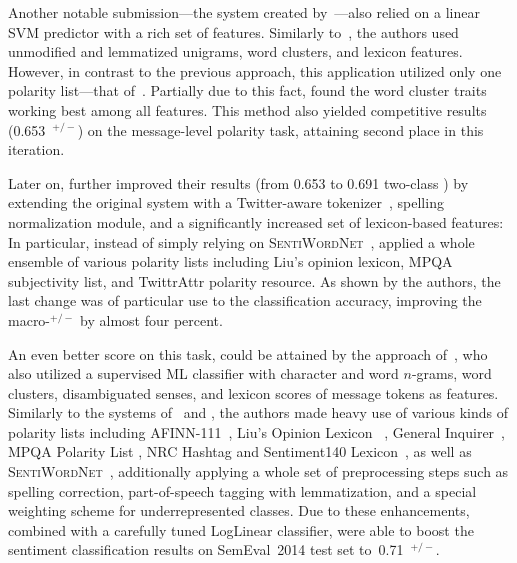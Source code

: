 Another notable submission---the system created
by~\citet{Guenther:13}---also relied on a linear SVM predictor with a
rich set of features.  Similarly to~\citet{Mohammad:13}, the authors
used unmodified and lemmatized unigrams, word clusters, and lexicon
features.  However, in contrast to the previous approach, this
application utilized only one polarity list---that
of~\citet{Esuli:05}.  Partially due to this fact,
\citeauthor{Guenther:13} found the word cluster traits working best
among all features.  This method also yielded competitive results
(0.653~\F{}$^{+/-}$) on the message-level polarity task, attaining
second place in this iteration.

Later on, \citet{Guenther:14} further improved their results (from
0.653 to 0.691 two-class \F) by extending the original system with a
Twitter-aware tokenizer~\cite{Owoputi:13}, spelling normalization
module, and a significantly increased set of lexicon-based features:
In particular, instead of simply relying on
\textsc{SentiWordNet}~\cite{Esuli:05}, \citeauthor{Guenther:14}
applied a whole ensemble of various polarity lists including Liu's
opinion lexicon, MPQA subjectivity list, and TwittrAttr polarity
resource.  As shown by the authors, the last change was of particular
use to the classification accuracy, improving the macro-\F{}$^{+/-}$
by almost four percent.

An even better score on this task, could be attained by the approach
of~\citet{Miura:14}, who also utilized a supervised ML classifier with
character and word $n$-grams, word clusters, disambiguated senses, and
lexicon scores of message tokens as features.  Similarly to the
systems of~\citet{Mohammad:13} and \citet{Guenther:14}, the authors
made heavy use of various kinds of polarity lists including
AFINN-111~\cite{Nielsen:11}, Liu's Opinion Lexicon~\cite{Hu:04} ,
General Inquirer~\cite{Stone:66}, MPQA Polarity List \cite{Wiebe:05a},
NRC Hashtag and Sentiment140 Lexicon~\cite{Mohammad:13}, as well as
\textsc{SentiWordNet}~\cite{Esuli:06a}, additionally applying a whole
set of preprocessing steps such as spelling correction, part-of-speech
tagging with lemmatization, and a special weighting scheme for
underrepresented classes.  Due to these enhancements, combined with a
carefully tuned LogLinear classifier, \citet{Miura:14} were able to
boost the sentiment classification results on SemEval~2014 test set
to~0.71~\F{}$^{+/-}$.

